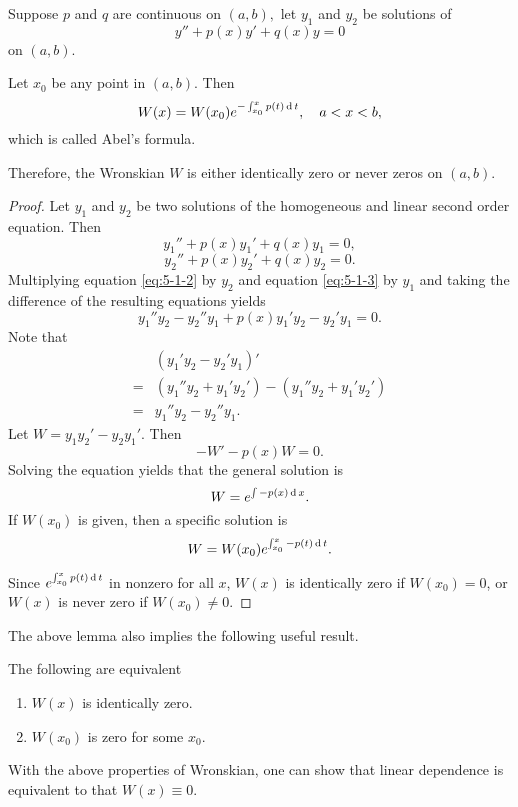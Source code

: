\begin{lemma}\label{lem:WronskianIntp}
  Suppose $p$ and $q$ are continuous on $(a,b),$ let $y_1$ and $y_2$ be solutions of
\[y''+p(x)y'+q(x)y=0\]
on $(a,b)$.

Let $x_0$ be any point in $(a,b)$. Then
\[W(x)=W(x_0) e^{-\int^x_{x_0}p(t)\operatorname{d} t}, \quad a<x<b,\]
which is called Abel's formula.

Therefore, the Wronskian $W$ is either identically zero or never zeros on $(a,b)$.
\end{lemma}
\begin{proof}
Let $y_1$ and $y_2$ be two solutions of the homogeneous and linear second order equation. Then
\begin{equation}
y_1''+p(x)y_1'+q(x)y_1=0, \label{eq:5-1-2}
\end{equation}
\begin{equation}
y_2''+p(x)y_2'+q(x)y_2=0. \label{eq:5-1-3}
\end{equation}
Multiplying equation \ref{eq:5-1-2} by $y_2$ and equation \ref{eq:5-1-3} by $y_1$ and taking the difference of the resulting equations yields
\[y_1''y_2-y_2''y_1+p(x)y_1'y_2-y_2'y_1=0.\]
Note that 
\[
\begin{aligned}
&(y_1'y_2-y_2'y_1)'\\
=&(y_1''y_2+y_1'y_2')-(y_1''y_2+y_1'y_2')\\
=&y_1''y_2-y_2''y_1.
\end{aligned}
\]
Let $W=y_1y_2'-y_2y_1'$. Then
\[-W'-p(x)W=0.\]
Solving the equation yields that the general solution is
\[W=e^{\int -p(x)\operatorname{d} x}.\]
If $W(x_0)$ is given, then a specific solution is
\[W=W(x_0)e^{\int_{x_0}^x -p(t)\operatorname{d} t}.\]

Since $e^{\int_{x_0}^x p(t)\operatorname{d} t}$ in nonzero for all $x$, $W(x)$ is identically zero if $W(x_0)=0$, or $W(x)$ is never zero if $W(x_0)\ne 0$.
\end{proof}

The above lemma also implies the following useful result.

\begin{corollary}
The following are equivalent
\begin{enumerate}
    \item $W(x)$ is identically zero.
    \item $W(x_0)$ is zero for some $x_0$.
\end{enumerate}
\end{corollary}

With the above properties of Wronskian, one can show that linear dependence is equivalent to that $W(x)\equiv 0$.

